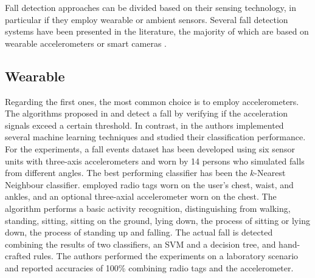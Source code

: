 Fall detection approaches can be divided based on their sensing technology, in particular if they employ wearable or ambient sensors. Several fall detection systems have been presented in
the literature, the majority of which are based on wearable accelerometers or
smart cameras \cite{mubashir2013survey, khan2017review, lapierre2017state, pannurat2014automatic, xu2018new, el2013fall}. 

\subsection{Wearable}
Regarding the first ones, the most common choice is to employ accelerometers. The algorithms proposed in \cite{Bourke2007} and \cite{Charlon2013} detect a fall by verifying if the acceleration signals exceed a certain threshold. In contrast, in \cite{Ozdemir2014} the authors implemented several machine learning techniques and studied their classification performance. For the experiments, a fall events dataset has been developed using six sensor units with three-axis accelerometers and worn by 14 persons who simulated falls from different angles. The best performing classifier has been the $k$-Nearest Neighbour classifier. \cite{Lustrek2015} employed radio tags worn on the user's chest, waist, and ankles, and an optional three-axial accelerometer worn on the chest. The algorithm performs a basic activity recognition, distinguishing from walking, standing, sitting, sitting on the ground, lying down, the process of sitting or lying down, the process of standing up and falling. The actual fall is detected combining the results of two classifiers, an SVM and a decision tree, and hand-crafted rules. The authors performed the experiments on a laboratory scenario and reported accuracies of 100\% combining radio tags and the accelerometer.

